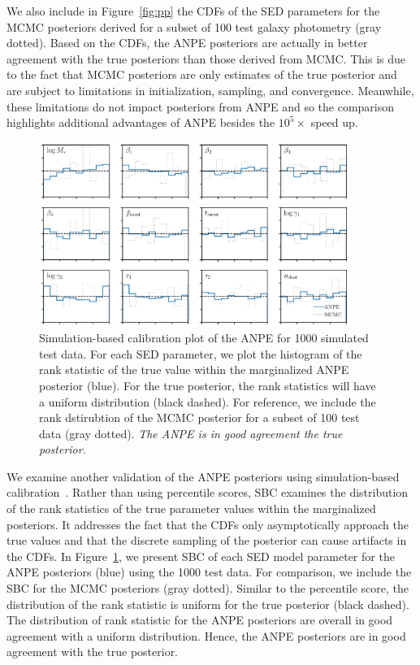 We also include in Figure~\ref{fig:pp} the CDFs of the SED parameters for the
MCMC posteriors derived for a subset of 100 test galaxy photometry (gray
dotted). 
Based on the CDFs, the ANPE posteriors are actually in better agreement with
the true posteriors than those derived from MCMC.
This is due to the fact that MCMC posteriors are only estimates of the true
posterior and are subject to limitations in initialization, sampling, and
convergence.
Meanwhile, these limitations do not impact posteriors from ANPE and so the
comparison highlights additional advantages of ANPE besides the $10^5\times$
speed up.

\begin{figure}
\begin{center}
    \includegraphics[width=0.9\textwidth]{figs/sbc.pdf}
    \caption{\label{fig:sbc}
    Simulation-based calibration plot of the ANPE for 1000 simulated test data. 
    For each SED parameter, we plot the histogram of the rank statistic of the
    true value within the marginalized ANPE posterior (blue). 
    For the true posterior, the rank statistics will have a uniform
    distribution (black dashed). 
    For reference, we include the rank dstirubtion of the MCMC posterior for a
    subset of 100 test data (gray dotted). 
    \emph{The ANPE is in good agreement the true posterior.}
    }
\end{center}
\end{figure}

We examine another validation of the ANPE posteriors using simulation-based
calibration~\citep[SBC;][]{talts2020}. 
Rather than using percentile scores, SBC examines the distribution of the rank
statistics of the true parameter values within the marginalized posteriors. 
It addresses the fact that the CDFs only asymptotically approach the true
values and that the discrete sampling of the posterior can cause artifacts in
the CDFs. 
In Figure~\ref{fig:sbc}, we present SBC of each SED model parameter for the
ANPE posteriors (blue) using the 1000 test data.
For comparison, we include the SBC for the MCMC posteriors (gray dotted). 
Similar to the percentile score, the distribution of the rank statistic is
uniform for the true posterior (black dashed). 
The distribution of rank statistic for the ANPE posteriors are overall in good
agreement with a uniform distribution. 
Hence, the ANPE posteriors are in good agreement with the true posterior. 

